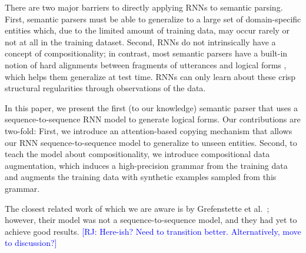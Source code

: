 \documentclass[11pt,letterpaper]{article}
\newcommand\pl[1]{\textcolor{red}{[PL: #1]}}
\newcommand\rj[1]{\textcolor{blue}{[RJ: #1]}}
\begin{document}
There are two major barriers to directly applying RNNs to semantic parsing.
First, semantic parsers must be able to generalize to a large set of 
domain-specific entities which, due to the limited
amount of training data, may occur rarely or not at all
in the training dataset.
Second, RNNs do not intrinsically have a concept of compositionality;
in contrast, most semantic parsers have a built-in notion of
hard alignments between fragments of utterances and logical forms
\cite{zettlemoyer05ccg,berant2013freebase},
which helps them generalize at test time.
RNNs can only learn about these crisp structural regularities
through observations of the data.


In this paper, we present the first (to our knowledge)
semantic parser that uses a sequence-to-sequence RNN model to generate
logical forms.  
Our contributions are two-fold:
First, we introduce an attention-based copying mechanism 
that allows our RNN sequence-to-sequence model to generalize to unseen entities.
Second, to teach the model about compositionality,
we introduce compositional data augmentation,
which induces a high-precision grammar from the training data
and augments the training data with synthetic examples sampled from this grammar.


The closest related work of which we are aware is
by Grefenstette et al.~;
however, their model was not a sequence-to-sequence model,
and they had yet to achieve good results.
\rj{Here-ish?  Need to transition better.  Alternatively, move to discussion?}
\end{document}
